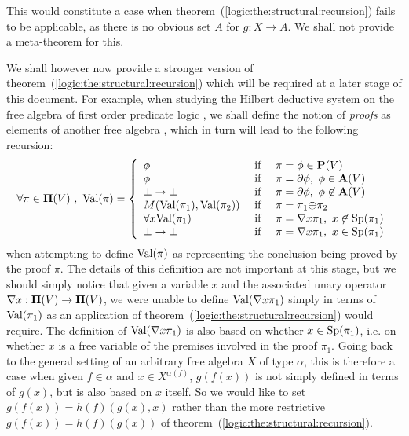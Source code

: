 This would constitute a case when
theorem~(\ref{logic:the:structural:recursion}) fails to be
applicable, as there is no obvious set $A$ for $g:X\to A$. We shall
not provide a meta-theorem for this.

We shall however now provide a stronger version of
theorem~(\ref{logic:the:structural:recursion}) which will be
required at a later stage of this document. For example, when
studying the Hilbert deductive system on the free algebra of first
order predicate logic \pv, we shall define the notion of {\em
proofs} as elements of another free algebra \pvs, which in turn will
lead to the following recursion:
\[
    \forall\pi\in\pvs\ ,\ \val(\pi)=\left\{
                    \begin{array}{lcl}
                    \phi&\mbox{\ if\ }&\pi=\phi\in\pv\\
                    \phi&\mbox{\ if\ }&\pi=\axi\phi,\ \phi\in\av\\
                    \bot\to\bot&\mbox{\ if\ }&\pi=\axi\phi,\ \phi\not\in\av\\
                    M(\val(\pi_{1}), \val(\pi_{2})) &\mbox{\ if\ }&\pi=\pi_{1}\pon\pi_{2}\\
                    \forall x\val(\pi_{1})&\mbox{\ if\ }&\pi=\gen
                    x\pi_{1},\  x\not\in\spec(\pi_{1})\\
                    \bot\to\bot&\mbox{\ if\ }&\pi=\gen
                    x\pi_{1},\  x\in\spec(\pi_{1})\\
                    \end{array}\right.
\]
when attempting to define $\mbox{\rm Val}(\pi)$ as representing the conclusion
being proved by the proof $\pi$. The details of this definition are
not important at this stage, but we should simply notice that given
a variable $x$ and the associated unary operator $\mbox{$\nabla$}
x:\mbox{${\bf\Pi}(V)$}\to\mbox{${\bf\Pi}(V)$}$, we were unable to define $\mbox{\rm Val}(\mbox{$\nabla$} x\pi_{1})$
simply in terms of $\mbox{\rm Val}(\pi_{1})$ as an application of
theorem~(\ref{logic:the:structural:recursion}) would require. The
definition of $\mbox{\rm Val}(\mbox{$\nabla$} x\pi_{1})$ is also based on whether
$x\in\mbox{\rm Sp}(\pi_{1})$, i.e. on whether $x$ is a free variable of the
premises involved in the proof $\pi_{1}$. Going back to the general
setting of an arbitrary free algebra $X$ of type $\alpha$, this is
therefore a case when given $f\in\alpha$ and $x\in X^{\alpha(f)}$,
$g(f(x))$ is not simply defined in terms of $g(x)$, but is also
based on $x$ itself. So we would like to set $g(f(x))=h(f)(g(x),x)$
rather than the more restrictive $g(f(x))=h(f)(g(x))$ of
theorem~(\ref{logic:the:structural:recursion}).

